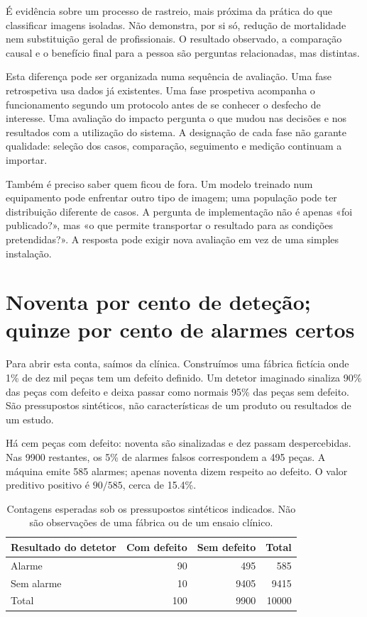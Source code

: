 É evidência sobre um processo de rastreio, mais próxima da prática do que classificar imagens isoladas. Não demonstra, por si só, redução de mortalidade nem substituição geral de profissionais. O resultado observado, a comparação causal e o benefício final para a pessoa são perguntas relacionadas, mas distintas.

Esta diferença pode ser organizada numa sequência de avaliação. Uma fase retrospetiva usa dados já existentes. Uma fase prospetiva acompanha o funcionamento segundo um protocolo antes de se conhecer o desfecho de interesse. Uma avaliação do impacto pergunta o que mudou nas decisões e nos resultados com a utilização do sistema. A designação de cada fase não garante qualidade: seleção dos casos, comparação, seguimento e medição continuam a importar.

Também é preciso saber quem ficou de fora. Um modelo treinado num equipamento pode enfrentar outro tipo de imagem; uma população pode ter distribuição diferente de casos. A pergunta de implementação não é apenas «foi publicado?», mas «o que permite transportar o resultado para as condições pretendidas?». A resposta pode exigir nova avaliação em vez de uma simples instalação.

\section{Noventa por cento de deteção; quinze por cento de alarmes certos}
Para abrir esta conta, saímos da clínica. Construímos uma fábrica fictícia onde 1\% de dez mil peças tem um defeito definido. Um detetor imaginado sinaliza 90\% das peças com defeito e deixa passar como normais 95\% das peças sem defeito. São pressupostos sintéticos, não características de um produto ou resultados de um estudo.

Há cem peças com defeito: noventa são sinalizadas e dez passam despercebidas. Nas 9900 restantes, os 5\% de alarmes falsos correspondem a 495 peças. A máquina emite 585 alarmes; apenas noventa dizem respeito ao defeito. O valor preditivo positivo é $90/585$, cerca de 15.4\%.

\begin{table}[htbp]
\small
\begin{tabularx}{\textwidth}{@{}Xrrr@{}}
\toprule
Resultado do detetor & Com defeito & Sem defeito & Total \\
\midrule
Alarme & 90 & 495 & 585 \\
Sem alarme & 10 & 9405 & 9415 \\
Total & 100 & 9900 & 10000 \\
\bottomrule
\end{tabularx}
\caption{Contagens esperadas sob os pressupostos sintéticos indicados. Não são observações de uma fábrica ou de um ensaio clínico.}
\label{tab:alarme-raro}
\end{table}

